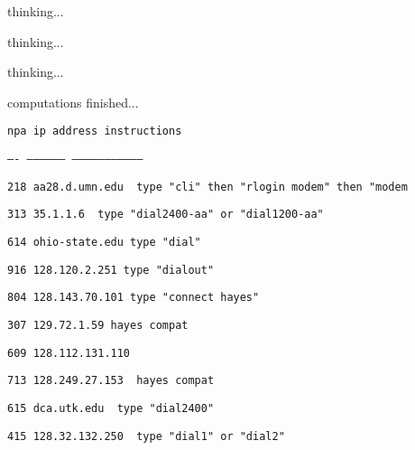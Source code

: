 \documentclass[white]{guildcamp3}
\begin{document}
\name{\wEndWorldFour{}} %

thinking...

thinking...

thinking...

computations finished...

\texttt{npa     ip address              instructions}

\texttt{----    ------------------      --------------------------------}

\texttt{218     aa28.d.umn.edu~         type "cli" then "rlogin modem" then "modem}

\texttt{313     35.1.1.6~               type "dial2400-aa" or "dial1200-aa"}

\texttt{614     ohio-state.edu          type "dial"}

\texttt{916     128.120.2.251           type "dialout"}

\texttt{804     128.143.70.101          type "connect hayes"}

\texttt{307     129.72.1.59             hayes compat}

\texttt{609     128.112.131.110~}

\texttt{713     128.249.27.153~         hayes compat}

\texttt{615     dca.utk.edu~            type "dial2400"}

\texttt{415     128.32.132.250~         type "dial1" or "dial2"}
\end{document}
